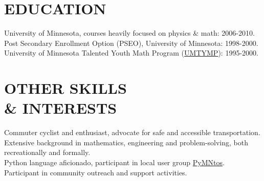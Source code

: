 \documentclass[line,margin]{res}
\begin{document}
\begin{resume}
\section{EDUCATION}
    University of Minnesota, courses heavily focused on physics \& math: 2006-2010.
    \vspace{1 mm} \\
    Post Secondary Enrollment Option (PSEO), University of Minnesota:
    1998-2000.
    \vspace{1 mm} \\
    University of Minnesota Talented Youth Math Program
    (\href{http://mathcep.umn.edu/umtymp/}{UMTYMP}):
    1995-2000.

\section{OTHER SKILLS \\ \& INTERESTS}
    Commuter cyclist and enthusiast, advocate for safe and accessible
    transportation.
    \vspace{1 mm} \\
    Extensive background in mathematics, engineering and problem-solving,
    both recreationally and formally.
    \vspace{1 mm} \\
    Python language aficionado, participant in local user group
    \href{http://www.python.mn/}{PyMNtos}. 
    \vspace{1 mm} \\
    Participant in community outreach and support activities.

\end{resume}
\end{document}
